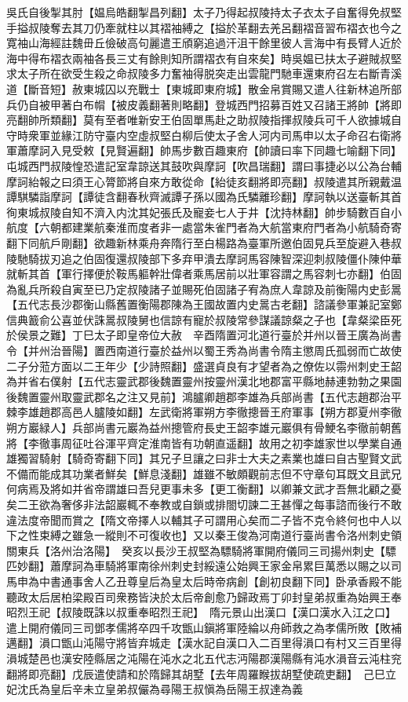 吳氏自後掣其肘【媪烏皓翻掣昌列翻】太子乃得起叔陵持太子衣太子自奮得免叔堅手搤叔陵奪去其刀仍牽就柱以其褶袖縛之【搤於革翻去羌呂翻褶音習布褶衣也今之寛袖山海經註魏毌丘儉破高句麗遣王頎窮追過汗沮干餘里彼人言海中有長臂人近於海中得布褶衣兩袖各長三丈有餘則知所謂褶衣有自來矣】時吳媪已扶太子避賊叔堅求太子所在欲受生殺之命叔陵多力奮袖得脱突走出雲龍門馳車還東府召左右斷青溪道【斷音短】赦東城囚以充戰士【東城即東府城】散金帛賞賜又遣人往新林追所部兵仍自被甲著白布㡌【被皮義翻著則略翻】登城西門招募百姓又召諸王將帥【將即亮翻帥所類翻】莫有至者唯新安王伯固單馬赴之助叔陵指揮叔陵兵可千人欲據城自守時衆軍並緣江防守臺内空虛叔堅白柳后使太子舍人河内司馬申以太子命召右衛將軍蕭摩訶入見受敕【見賢遍翻】帥馬步數百趣東府【帥讀曰率下同趣七喻翻下同】屯城西門叔陵惶恐遣記室韋諒送其鼓吹與摩訶【吹昌瑞翻】謂曰事捷必以公為台輔摩訶紿報之曰須王心膂節將自來方敢從命【紿徒亥翻將即亮翻】叔陵遣其所親戴温譚騏驎詣摩訶【譚徒含翻春秋齊滅譚子孫以國為氏驎離珍翻】摩訶執以送臺斬其首徇東城叔陵自知不濟入内沈其妃張氏及寵妾七人于井【沈持林翻】帥步騎數百自小航度【六朝都建業航秦淮而度者非一處當朱雀門者為大航當東府門者為小航騎奇寄翻下同航戶剛翻】欲趣新林乘舟奔隋行至白楊路為臺軍所邀伯固見兵至旋避入巷叔陵馳騎拔刃追之伯固復還叔陵部下多弃甲潰去摩訶馬容陳智深迎刺叔陵僵仆陳仲華就斬其首【軍行擇便於鞍馬軀幹壯偉者乘馬居前以壯軍容謂之馬容刺七亦翻】伯固為亂兵所殺自寅至已乃定叔陵諸子並賜死伯固諸子宥為庶人韋諒及前衡陽内史彭暠【五代志長沙郡衡山縣舊置衡陽郡陳為王國故置内史暠古老翻】諮議參軍兼記室鄭信典籖俞公喜並伏誅暠叔陵舅也信諒有寵於叔陵常參謀議諒粲之子也【韋粲梁臣死於侯景之難】丁巳太子即皇帝位大赦　辛酉隋置河北道行臺於并州以晉王廣為尚書令【并州治晉陽】置西南道行臺於益州以蜀王秀為尚書令隋主懲周氏孤弱而亡故使二子分蒞方面以二王年少【少詩照翻】盛選貞良有才望者為之僚佐以霛州刺史王韶為并省右僕射【五代志靈武郡後魏置靈州按靈州漢北地郡富平縣地赫連勃勃之果園後魏置靈州取靈武郡名之注又見前】鴻臚卿趙郡李雄為兵部尚書【五代志趙郡治平棘李雄趙郡高邑人臚陵如翻】左武衛將軍朔方李徹摠晉王府軍事【朔方郡夏州李徹朔方巖緑人】兵部尚書元巖為益州摠管府長史王韶李雄元巖俱有骨鯁名李徹前朝舊將【李徹事周征吐谷渾平齊定淮南皆有功朝直遥翻】故用之初李雄家世以學業自通雄獨習騎射【騎奇寄翻下同】其兄子旦讓之曰非士大夫之素業也雄曰自古聖賢文武不備而能成其功業者鮮矣【鮮息淺翻】雄雖不敏頗觀前志但不守章句耳既文且武兄何病焉及將如并省帝謂雄曰吾兒更事未多【更工衡翻】以卿兼文武才吾無北顧之憂矣二王欲為奢侈非法韶巖輒不奉教或自鎖或排閤切諫二王甚憚之每事諮而後行不敢違法度帝聞而賞之【隋文帝擇人以輔其子可謂用心矣而二子皆不克令終何也中人以下之性束縛之雖急一縱則不可復收也】又以秦王俊為河南道行臺尚書令洛州刺史領關東兵【洛州治洛陽】　癸亥以長沙王叔堅為驃騎將軍開府儀同三司揚州刺史【驃匹妙翻】蕭摩訶為車騎將軍南徐州刺史封綏遠公始興王家金帛累巨萬悉以賜之以司馬申為中書通事舍人乙丑尊皇后為皇太后時帝病創【創初良翻下同】卧承香殿不能聽政太后居柏梁殿百司衆務皆決於太后帝創愈乃歸政焉丁卯封皇弟叔重為始興王奉昭烈王祀【叔陵既誅以叔重奉昭烈王祀】　隋元景山出漢口【漢口漢水入江之口】遣上開府儀同三司鄧孝儒將卒四千攻甑山鎭將軍陸綸以舟師救之為孝儒所敗【敗補邁翻】溳口甑山沌陽守將皆弃城走【漢水記自漢口入二百里得溳口有村又三百里得溳城楚邑也漢安陸縣居之沌陽在沌水之北五代志沔陽郡漢陽縣有沌水溳音云沌柱兖翻將即亮翻】戊辰遣使請和於隋歸其胡墅【去年周羅睺拔胡墅使疏吏翻】　己巳立妃沈氏為皇后辛未立皇弟叔儼為尋陽王叔愼為岳陽王叔達為義